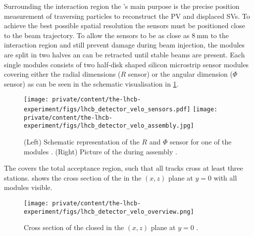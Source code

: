 Surrounding the \protonproton interaction region the \VELO's main purpose is the
precise position measurement of traversing particles to reconstruct the \ac{PV}
and displaced \acp{SV}. To achieve the best possible spatial resolution the
sensors must be positioned close to the beam trajectory. To allow the sensors to
be as close as $\SI{8}{\milli\metre}$ to the interaction region and still
prevent damage during beam injection, the \VELO modules are split in two halves
an can be retracted until stable beams are present. Each single modules consists
of two half-disk shaped silicon microstrip sensor modules covering either the
radial dimensions ($R$ sensor) or the angular dimension ($\Phi$ sensor) as can
be seen in the schematic visualisation in
\cref{fig:lhcb_experiment:tracking:velo:sensor}.
%
\begin{figure}[t]
  \texttt{[image: private/content/the-lhcb-experiment/figs/lhcb\_detector\_velo\_sensors.pdf]}
  \texttt{[image: private/content/the-lhcb-experiment/figs/lhcb\_detector\_velo\_assembly.jpg]}
  \caption{(Left) Schematic representation of the $R$ and $\Phi$ sensor for one
  of the \VELO modules \cite{Alves:2008zz}. (Right) Picture of the \VELO during
  assembly \cite{Aaij:1707015}. }
  \label{fig:lhcb_experiment:tracking:velo:sensor}
\end{figure}
%
The \VELO covers the total \LHCb acceptance region, such that all tracks cross
at least three \VELO stations. 
shows the cross section of the \VELO in the $(x,z)$ plane at $y=0$ with all
modules visible. 
%
\begin{figure}[t]
  \texttt{[image: private/content/the-lhcb-experiment/figs/lhcb\_detector\_velo\_overview.png]}
  \caption{
    Cross section of the closed \VELO in the $(x,z)$ plane at $y=0$ \cite{Alves:2008zz}.
  }
  \label{fig:lhcb_experiment:tracking:velo:overview}
\end{figure}

